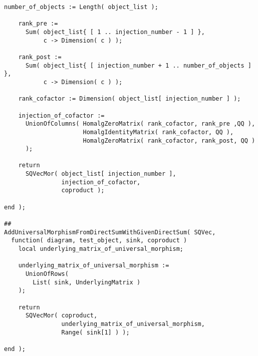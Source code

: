 \begin{small}
\begin{Verbatim}[frame=single]
    number_of_objects := Length( object_list );
    
    rank_pre :=
      Sum( object_list{ [ 1 .. injection_number - 1 ] },
           c -> Dimension( c ) );
    
    rank_post :=
      Sum( object_list{ [ injection_number + 1 .. number_of_objects ] },
           c -> Dimension( c ) );
    
    rank_cofactor := Dimension( object_list[ injection_number ] );
    
    injection_of_cofactor := 
      UnionOfColumns( HomalgZeroMatrix( rank_cofactor, rank_pre ,QQ ),
                      HomalgIdentityMatrix( rank_cofactor, QQ ),
                      HomalgZeroMatrix( rank_cofactor, rank_post, QQ )
      );
    
    return
      SQVecMor( object_list[ injection_number ],
                injection_of_cofactor,
                coproduct );
    
end );

##
AddUniversalMorphismFromDirectSumWithGivenDirectSum( SQVec,
  function( diagram, test_object, sink, coproduct )
    local underlying_matrix_of_universal_morphism;
    
    underlying_matrix_of_universal_morphism :=
      UnionOfRows(
        List( sink, UnderlyingMatrix )
    );
    
    return
      SQVecMor( coproduct,
                underlying_matrix_of_universal_morphism,
                Range( sink[1] ) );
    
end );
\end{Verbatim}
\end{small}
